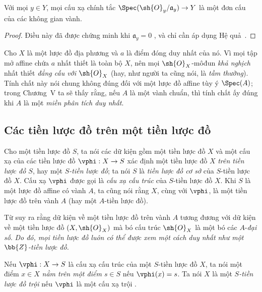 \documentclass[oneside]{amsart}
\makeatletter
\newcommand{\ega@arrow}[2]{\mathchoice{#1}{#2}{#2}{#2}}
\renewcommand{\to}{\ega@arrow{\longrightarrow}{\rightarrow}}
\let\EGAOriginalLabel\label
\renewcommand{\label}[1]{\phantomsection\EGAOriginalLabel{#1}}
\makeatother
\begin{document}
\begin{corollary}[2.4.7]
\label{I.2.4.7}
Với mọi $y\in Y$, mọi cấu xạ chính tắc
$\Spec(\sh{O}_y/\mathfrak{a}_y)\to Y$ là một đơn cấu của các không gian
vành.
\end{corollary}

\begin{proof}
Điều này đã được chứng minh khi $\mathfrak{a}_y=0$ , và
chỉ cần áp dụng Hệ quả~.
\end{proof}

\begin{remark}[2.4.8]
\label{I.2.4.8}
Cho $X$ là một lược đồ địa phương và $a$ là điểm đóng duy nhất của nó.
Vì mọi tập mở affine chứa $a$ nhất thiết là toàn bộ $X$, nên mọi $\sh{O}_X$-môđun \emph{khả nghịch}  nhất thiết \emph{đẳng cấu với $\sh{O}_X$} (hay, như người ta cũng nói, là \emph{tầm thường}).
Tính chất này nói chung không đúng đối với một lược đồ affine tùy ý $\Spec(A)$;
trong Chương~V ta sẽ thấy rằng, nếu $A$ là một vành chuẩn, thì tính chất ấy đúng khi $A$ là một \emph{miền phân tích duy nhất}.
\end{remark}

\subsection{Các tiền lược đồ trên một tiền lược đồ}
\label{subsection:I.2.5}

\begin{definition}[2.5.1]
\label{I.2.5.1}
Cho một tiền lược đồ $S$, ta nói các dữ kiện gồm một tiền lược đồ $X$ và một cấu xạ của các tiền lược đồ $\vphi:X\to S$ xác định một tiền lược đồ $X$ \emph{trên tiền lược đồ $S$}, hay một \emph{$S$-tiền lược đồ}; ta nói $S$ là \emph{tiền lược đồ cơ sở} của $S$-tiền lược đồ $X$.
Cấu xạ $\vphi$ được gọi là \emph{cấu xạ cấu trúc} của $S$-tiền lược đồ $X$.
Khi $S$ là một lược đồ affine có vành $A$, ta cũng nói rằng $X$, cùng với $\vphi$, là một tiền lược đồ trên vành $A$ (hay một $A$-tiền lược đồ).
\end{definition}

Từ  suy ra rằng dữ kiện về một tiền lược đồ trên vành $A$ tương đương với dữ kiện về một tiền lược đồ $(X,\sh{O}_X)$ mà bó cấu trúc $\sh{O}_X$ là một bó các $A$-\emph{đại số}.
\emph{Do đó, mọi tiền lược đồ luôn có thể được xem một cách duy nhất như một $\bb{Z}$-tiền lược đồ.}

Nếu $\vphi:X\to S$ là cấu xạ cấu trúc của một $S$-tiền lược đồ $X$, ta nói một điểm $x\in X$ \emph{nằm trên một điểm $s\in S$} nếu $\vphi(x)=s$.
Ta nói $X$ là một \emph{$S$-tiền lược đồ trội} nếu $\vphi$ là một cấu xạ trội .
\end{document}
